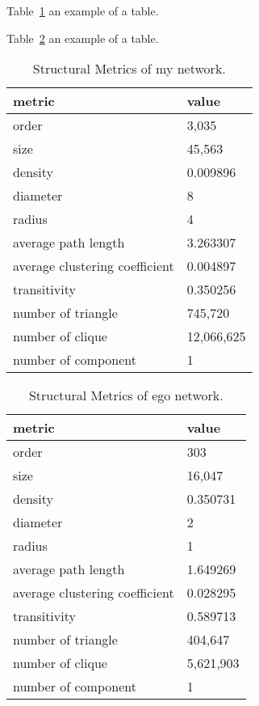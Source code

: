 \documentclass[runningheads]{llncs}
\begin{document}
Table~\ref{tab_my} an example of a table.

Table~\ref{tab_ego} an example of a table.

\begin{table}
\caption{Structural Metrics of my network.}\label{tab_my}
\begin{tabular}{|l|l|}
\hline
metric & value \\
\hline
order & 3,035 \\
size & 45,563 \\
density & 0.009896 \\
diameter & 8 \\
radius & 4 \\
average path length & 3.263307 \\
average clustering coefficient & 0.004897 \\
transitivity & 0.350256 \\
number of triangle & 745,720 \\ 
number of clique & 12,066,625 \\
number of component & 1\\
\hline
\end{tabular}
\end{table}




\begin{table}
\caption{Structural Metrics of ego network.}\label{tab_ego}
\begin{tabular}{|l|l|}
\hline
metric & value \\
\hline
order & 303 \\
size & 16,047 \\
density & 0.350731 \\
diameter & 2 \\
radius & 1 \\
average path length & 1.649269 \\ 
average clustering coefficient & 0.028295 \\ 
transitivity & 0.589713 \\ 
number of triangle & 404,647 \\ 
number of clique & 5,621,903 \\ 
number of component & 1 \\ 
\hline
\end{tabular}
\end{table}
\end{document}
